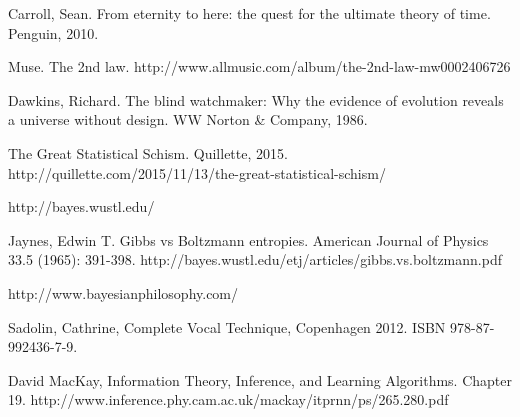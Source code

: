 \documentclass[a4paper, 12pt]{article}
\begin{document}
\begin{thebibliography}{999} %
Carroll, Sean. From eternity to here: the quest for the ultimate theory of time. Penguin, 2010.

Muse. The 2nd law.
http://www.allmusic.com/album/the-2nd-law-mw0002406726

Dawkins, Richard. The blind watchmaker: Why the evidence of evolution reveals a universe without design. WW Norton \& Company, 1986.

 The Great Statistical Schism. Quillette, 2015.
http://quillette.com/2015/11/13/the-great-statistical-schism/

http://bayes.wustl.edu/

Jaynes, Edwin T.
Gibbs vs Boltzmann entropies. American Journal of Physics 33.5 (1965): 391-398.
http://bayes.wustl.edu/etj/articles/gibbs.vs.boltzmann.pdf

http://www.bayesianphilosophy.com/

Sadolin, Cathrine, Complete Vocal Technique, Copenhagen 2012.
ISBN 978-87-992436-7-9.

David MacKay, Information Theory, Inference, and Learning Algorithms.
Chapter 19.
http://www.inference.phy.cam.ac.uk/mackay/itprnn/ps/265.280.pdf

\end{thebibliography}
\end{document}
